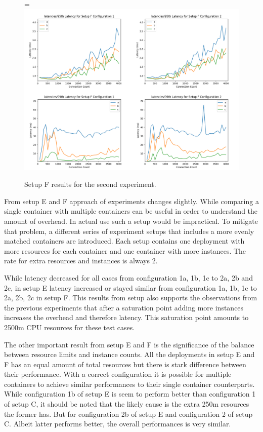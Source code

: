 \documentclass[12pt,oneandhalf,chaparabic,ceng,ms,eng,oneside,pntc]{gsufbe}
\makeatletter
\let\old@includegraphics\includegraphics
\renewcommand{\includegraphics}[2][,]{%
  \setbox9=\hbox{\old@includegraphics[#1]{#2}}%
  \ifdim\wd9>\textwidth
    \old@includegraphics[#1,width=\textwidth]{#2}%
  \else
    \old@includegraphics[#1]{#2}%
  \fi%
}
\makeatother
\begin{document}
\begin{figure}
\centering
\includegraphics[]{setupf.png}
\caption{Setup F results for the second experiment.}
\label{fig:setupf}
\end{figure}

From setup E and F approach of experiments changes slightly. While comparing a single container
with multiple containers can be useful in order to understand the amount of overhead. In actual use
such a setup would be impractical. To mitigate that problem, a different series of experiment
setups that includes a more evenly matched containers are introduced. Each setup contains one 
deployment with more resources for each container and one container with more instances. The rate for
extra resources and instances is always 2.

While latency decreased for all cases from configuration 1a, 1b, 1c to 2a, 2b and 2c, in setup E 
latency increased or stayed similar from configuration 1a, 1b, 1c to 2a, 2b, 2c in setup F. This
results from setup  also supports the observations from the previous experiments that after a
saturation point adding more instances increases the overhead and therefore latency. This saturation
point amounts to 2500m CPU resources for these test cases. 

The other important result from setup E and F is the significance of the balance between resource limits
and instance counts. All the deployments in setup E and F has an equal amount of total resources but there
is stark difference between their performance. With a correct configuration it is possible for multiple
containers to achieve similar performances to their single container counterparts. While configuration 1b
of setup E is seem to perform better than configuration 1 of setup C, it should be noted that the likely
cause is the extra 250m resources the former has. But for configuration 2b of setup E and configuration 2
of setup C. Albeit latter performs better, the overall performances is very similar.
\end{document}
